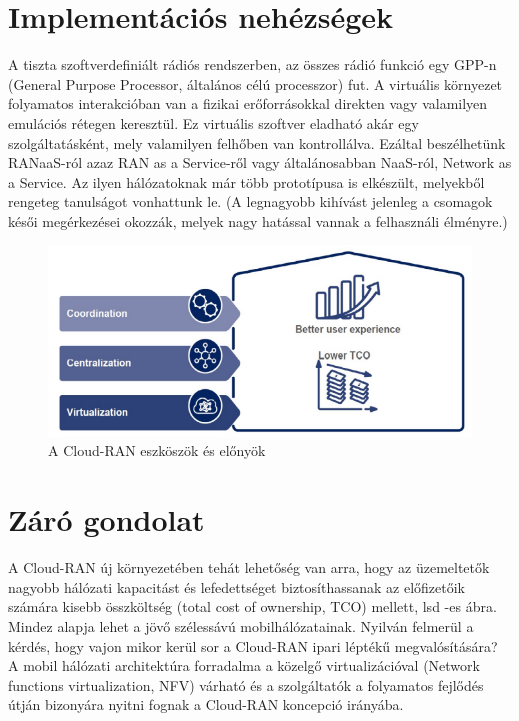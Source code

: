 \section{Implementációs nehézségek}
\hspace{2mm}
\indent A tiszta szoftverdefiniált rádiós rendszerben, az összes rádió funkció egy GPP-n (General Purpose Processor, általános célú processzor) fut. A virtuális környezet folyamatos interakcióban van a fizikai erőforrásokkal direkten vagy valamilyen emulációs rétegen keresztül. Ez virtuális szoftver eladható akár egy szolgáltatásként, mely valamilyen felhőben van kontrollálva. Ezáltal beszélhetünk RANaaS-ról azaz RAN as a Service-ről vagy általánosabban NaaS-ról, Network as a Service. Az ilyen hálózatoknak már több prototípusa is elkészült, melyekből rengeteg tanulságot vonhattunk le. (A legnagyobb kihívást jelenleg a csomagok késői megérkezései okozzák, melyek nagy hatással vannak a felhasználi élményre.)\cite{Architecture}\cite{ImplementationIssues}\cite{ImplementingGPP}
\begin{figure}[!ht]
\centering
\includegraphics[width=\textwidth, keepaspectratio]{figures/cool.png}
\caption{A Cloud-RAN eszköszök és előnyök} 
\label{fig:cool}
\end{figure}
\section{Záró gondolat}
\indent A Cloud-RAN új környezetében tehát lehetőség van arra, hogy az üzemeltetők nagyobb hálózati kapacitást és lefedettséget biztosíthassanak az előfizetőik számára kisebb összköltség (total cost of ownership, TCO) mellett, lsd -es ábra. Mindez alapja lehet a jövő szélessávú mobilhálózatainak. Nyilván felmerül a kérdés, hogy vajon mikor kerül sor a Cloud-RAN ipari léptékű megvalósítására? A mobil hálózati architektúra forradalma a közelgő virtualizációval (Network functions virtualization, NFV) várható és a szolgáltatók a folyamatos fejlődés útján bizonyára nyitni fognak a Cloud-RAN koncepció irányába. 